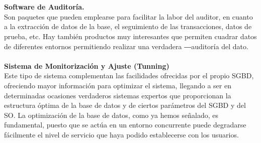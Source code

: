 \documentclass[twoside,twocolumn]{article}
\begin{document}
\begin{flushright}
\begin{itemize}
\textbf{}\\
\textbf{}\\

\textbf{Software de Auditoría.}\\
Son paquetes que pueden emplearse para facilitar la labor del auditor, en cuanto a la extracción de datos de la base, el seguimiento de las transacciones, datos de prueba, etc. Hay también productos muy interesantes que permiten cuadrar datos de diferentes entornos permitiendo realizar una verdadera ―auditoría del dato. 
\textbf{}\\
\textbf{}\\
\textbf{Sistema de Monitorización y Ajuste (Tunning) }\\
Este tipo de sistema complementan las facilidades ofrecidas por el propio SGBD, ofreciendo mayor información para optimizar el sistema, llegando a ser en determinadas ocasiones verdaderos sistemas expertos que proporcionan la estructura óptima de la base de datos y de ciertos parámetros del SGBD y del SO. La optimización de la base de datos, como ya hemos señalado, es fundamental, puesto que se actúa en un entorno concurrente puede degradarse fácilmente el nivel de servicio que haya podido establecerse con los usuarios.



\end{itemize}
\end{flushright}
\end{document}
